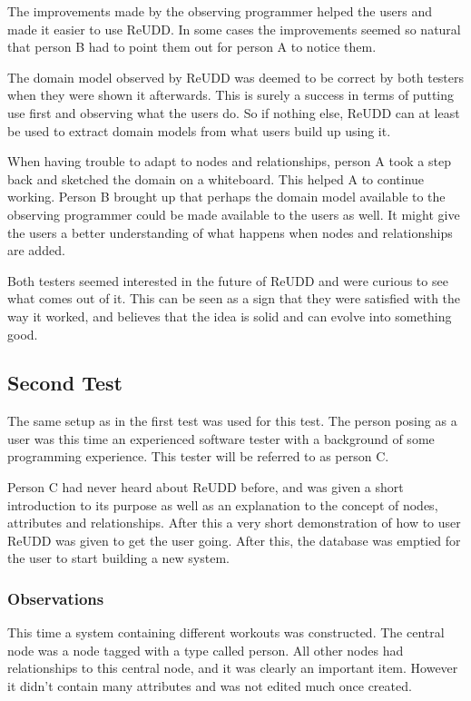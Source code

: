 \documentclass[a4paper]{report}
\begin{document}
The improvements made by the observing programmer helped the users and made it easier to use ReUDD. In some cases the improvements seemed so natural that person B had to point them out for person A to notice them.

The domain model observed by ReUDD was deemed to be correct by both testers when they were shown it afterwards. This is surely a success in terms of putting use first and observing what the users do. So if nothing else, ReUDD can at least be used to extract domain models from what users build up using it.

When having trouble to adapt to nodes and relationships, person A took a step back and sketched the domain on a whiteboard. This helped A to continue working. Person B brought up that perhaps the domain model available to the observing programmer could be made available to the users as well. It might give the users a better understanding of what happens when nodes and relationships are added.

Both testers seemed interested in the future of ReUDD and were curious to see what comes out of it. This can be seen as a sign that they were satisfied with the way it worked, and believes that the idea is solid and can evolve into something good.

\subsection{Second Test}
The same setup as in the first test was used for this test. The person posing as a user was this time an experienced software tester with a background of some programming experience. This tester will be referred to as person C. 

Person C had never heard about ReUDD before, and was given a short introduction to its purpose as well as an explanation to the concept of nodes, attributes and relationships. After this a very short demonstration of how to user ReUDD was given to get the user going. After this, the database was emptied for the user to start building a new system.

\subsubsection{Observations}
This time a system containing different workouts was constructed. The central node was a node tagged with a type called person. All other nodes had relationships to this central node, and it was clearly an important item. However it didn't contain many attributes and was not edited much once created.
\end{document}
